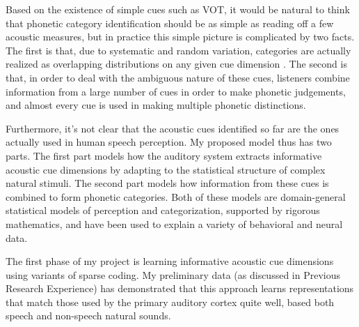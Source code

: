 \documentclass[12pt]{article}
\begin{document}
Based on the existence of simple cues such as VOT, it would be natural to think that phonetic category identification should be as simple as reading off a few acoustic measures, but in practice this simple picture is complicated by two facts.  The first is that, due to systematic and random variation, categories are actually realized as overlapping distributions on any given cue dimension \cite{Hillenbrand1995}.  The second is that, in order to deal with the ambiguous nature of these cues, listeners combine information from a large number of cues in order to make phonetic judgements, and almost every cue is used in making multiple phonetic distinctions.  


Furthermore, it's not clear that the acoustic cues identified so far are the ones actually used in human speech perception.  My proposed model thus has two parts.  The first part models how the auditory system extracts informative acoustic cue dimensions by adapting to the statistical structure of complex natural stimuli.  The second part models how information from these cues is combined to form phonetic categories.  Both of these models are domain-general statistical models of perception and categorization, supported by rigorous mathematics, and have been used to explain a variety of behavioral and neural data.

The first phase of my project is learning informative acoustic cue dimensions using variants of sparse coding.  My preliminary data (as discussed in Previous Research Experience) has demonstrated that this approach learns representations that match those used by the primary auditory cortex quite well, based both speech and non-speech natural sounds.

\end{document}
